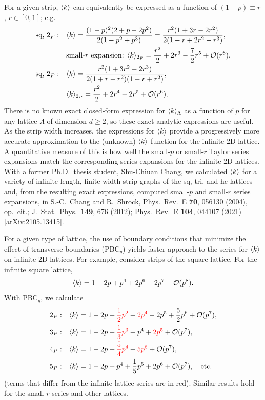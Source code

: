 For a given strip, $\langle k\rangle$ can equivalently be expressed as a function of $(1-p)\equiv r$, $r\in[0,1]$; e.g.
\begin{align}
  \text{sq, }2_F:&\quad \langle k\rangle = \frac{(1-p)^2(2+p-2p^2)}{2(1-p^2+p^3)} = \frac{r^2(1+3r-2r^2)}{2(1-r+2r^2-r^3)},\\
  &\quad\text{small-$r$ expansion: }\langle k\rangle_{2_F} = \frac{r^2}{2}+2r^3-\frac{7}{2}r^5+\mathcal{O}(r^6),\nonumber\\
  \text{sq, }2_P:&\quad \langle k\rangle = \frac{r^2(1+3r^2-2r^3)}{2(1+r-r^2)(1-r+r^2)},\\
  &\quad\langle k\rangle_{2_P} = \frac{r^2}{2}+2r^4-2r^5+\mathcal{O}(r^6).\nonumber
\end{align}
There is no known exact closed-form expression for $\langle k\rangle_\Lambda$ as a function of $p$ for any lattice $\Lambda$ of
dimension $d\ge 2$, so these exact analytic expressions are useful. As the strip width increases, the expressions for
$\langle k\rangle$ provide a progressively more accurate approximation to the (unknown) $\langle k\rangle$ function for the infinite 2D lattice.
A quantitative measure of this is how well the small-$p$ or small-$r$ Taylor series expansions match the corresponding
series expansions for the infinite 2D lattices. With a former Ph.D.\ thesis student, Shu-Chiuan Chang, we calculated
$\langle k\rangle$ for a variety of infinite-length, finite-width strip graphs of the sq, tri, and hc lattices and, from the
resulting exact expressions, computed small-$p$ and small-$r$ series expansions, in S.-C.~Chang and R.~Shrock, Phys.\ Rev.\
E \textbf{70}, 056130 (2004), op.\ cit.; J.\ Stat.\ Phys.\ \textbf{149}, 676 (2012); Phys.\ Rev.\ E \textbf{104}, 044107
(2021) [arXiv:2105.13415].

For a given type of lattice, the use of boundary conditions that minimize the effect of transverse boundaries (PBC$_y$)
yields faster approach to the series for $\langle k\rangle$ on infinite 2D lattices. For example, consider strips of the square
lattice. For the infinite square lattice,
\begin{equation}
  \langle k\rangle = 1-2p+p^4+2p^6-2p^7+\mathcal{O}(p^8).
\end{equation}
With PBC$_y$, we calculate
\begin{align}
  2_P:&\quad \langle k\rangle = 1-2p+{\color{red}\frac{1}{2}p^2}+{\color{red}2p^4}-2p^5+\frac{5}{2}p^6+\mathcal{O}(p^7),\\
  3_P:&\quad \langle k\rangle = 1-2p+{\color{red}\frac{1}{3}p^3}+p^4+{\color{red}2p^5}+\mathcal{O}(p^7),\\
  4_P:&\quad \langle k\rangle = 1-2p+{\color{red}\frac{5}{4}p^4}+{\color{red}5p^6}+\mathcal{O}(p^7),\\
  5_P:&\quad \langle k\rangle = 1-2p+p^4+\frac{1}{5}p^5+2p^6+\mathcal{O}(p^7),\quad\text{etc.}
\end{align}
(terms that differ from the infinite-lattice series are in red). Similar results hold for the small-$r$ series and other
lattices.

